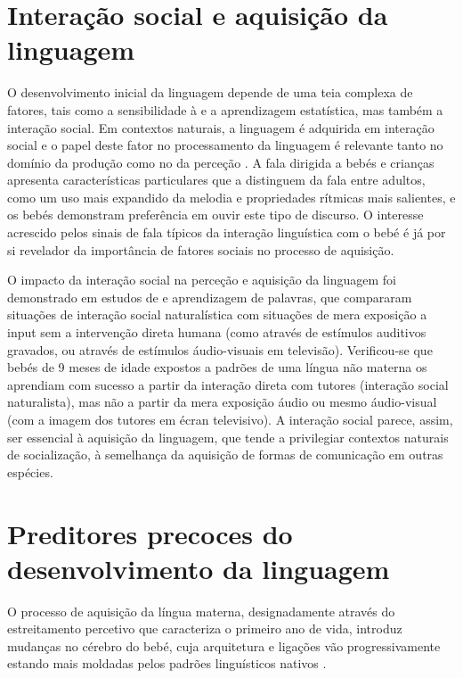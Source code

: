 \documentclass[output=paper]{LSP/langsci}
\begin{document}
\section{Interação social e aquisição da linguagem}
\label{sec:frota_interacao}

O desenvolvimento inicial da linguagem depende de uma teia complexa de fatores, tais como a sensibilidade à  e a aprendizagem estatística, mas também a interação social. Em contextos naturais, a linguagem é adquirida em interação social e o papel deste fator no processamento da linguagem é relevante tanto no domínio da produção como no da perceção \citep{kuhl2004}. A fala dirigida a bebés e crianças apresenta características particulares que a distinguem da fala entre adultos, como um uso mais expandido da melodia e propriedades rítmicas mais salientes, e os bebés demonstram preferência em ouvir este tipo de discurso. O interesse acrescido pelos sinais de fala típicos da interação linguística com o bebé é já por si revelador da importância de fatores sociais no processo de aquisição.

O impacto da interação social na perceção e aquisição da linguagem foi demonstrado em estudos de  e aprendizagem de palavras, que compararam situações de interação social naturalística com situações de mera exposição a input sem a intervenção direta humana (como através de estímulos auditivos gravados, ou através de estímulos áudio-visuais em televisão). Verificou-se que bebés de 9 meses de idade expostos a padrões de uma língua não materna os aprendiam com sucesso a partir da interação direta com tutores (interação social naturalista), mas não a partir da mera exposição áudio ou mesmo áudio-visual (com a imagem dos tutores em écran televisivo). A interação social parece, assim, ser essencial à aquisição da linguagem, que tende a privilegiar contextos naturais de socialização, à semelhança da aquisição de formas de comunicação em outras espécies.

\section{Preditores precoces do desenvolvimento da linguagem}
\label{sec:frota_preditores}

O processo de aquisição da língua materna, designadamente através do estreitamento percetivo que caracteriza o primeiro ano de vida, introduz mudanças no cérebro do bebé, cuja arquitetura e ligações vão progressivamente estando mais moldadas pelos padrões linguísticos nativos \citep{kuhl2004}. 
\end{document}
